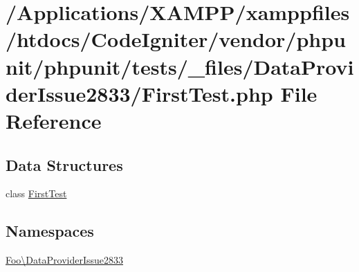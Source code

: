 \hypertarget{_data_provider_issue2833_2_first_test_8php}{}\section{/\+Applications/\+X\+A\+M\+P\+P/xamppfiles/htdocs/\+Code\+Igniter/vendor/phpunit/phpunit/tests/\+\_\+files/\+Data\+Provider\+Issue2833/\+First\+Test.php File Reference}
\label{_data_provider_issue2833_2_first_test_8php}
\subsection*{Data Structures}
\begin{DoxyCompactItemize}
\item 
class \mbox{\hyperlink{class_foo_1_1_data_provider_issue2833_1_1_first_test}{First\+Test}}
\end{DoxyCompactItemize}
\subsection*{Namespaces}
\begin{DoxyCompactItemize}
\item 
 \mbox{\hyperlink{namespace_foo_1_1_data_provider_issue2833}{Foo\textbackslash{}\+Data\+Provider\+Issue2833}}
\end{DoxyCompactItemize}

